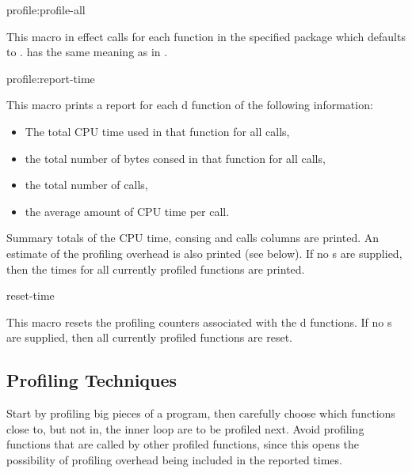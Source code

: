 \begin{defmac}{profile:}{profile-all}{%
    }
  
  This macro in effect calls  for each
  function in the specified package which defaults to
  .   has the same meaning as in
  .
\end{defmac}

\begin{defmac}{profile:}{report-time}{}
  
  This macro prints a report for each d function of the
  following information:
  \begin{itemize}
  \item The total CPU time used in that function for all calls,
  
  \item the total number of bytes consed in that function for all
    calls,
  
  \item the total number of calls,
  
  \item the average amount of CPU time per call.
  \end{itemize}
  Summary totals of the CPU time, consing and calls columns are
  printed.  An estimate of the profiling overhead is also printed (see
  below).  If no s are supplied, then the times for all
  currently profiled functions are printed.
\end{defmac}

\begin{defmac}{}{reset-time}{}
  
  This macro resets the profiling counters associated with the
  d functions.  If no s are supplied, then all
  currently profiled functions are reset.
\end{defmac}


\subsection{Profiling Techniques}

Start by profiling big pieces of a program, then carefully choose which
functions close to, but not in, the inner loop are to be profiled next.
Avoid profiling functions that are called by other profiled functions, since
this opens the possibility of profiling overhead being included in the reported
times.

